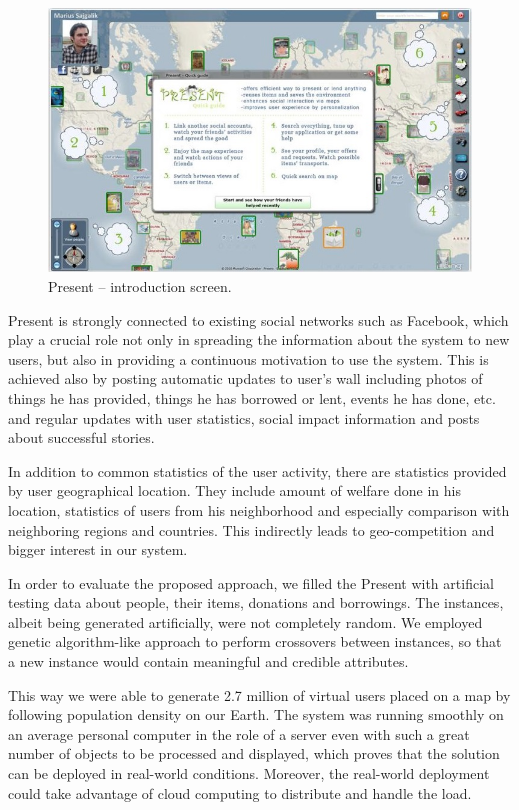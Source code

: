\documentclass[6pt]{article}
\begin{document}
\begin{figure}[ht]
\includegraphics[width=\textwidth]{images/fig4.jpg}
\caption{Present – introduction screen.}
\end{figure}

Present is strongly connected to existing social networks such as Facebook, which play a crucial role not only in spreading the information about the system to new users, but also in providing a continuous motivation to use the system. This is achieved also by posting automatic updates to user's wall including photos of things he has provided, things he has borrowed or lent, events he has done, etc. and regular updates with user statistics, social impact information and posts about successful stories.

In addition to common statistics of the user activity, there are statistics provided by user geographical location. They include amount of welfare done in his location, statistics of users from his neighborhood and especially comparison with neighboring regions and countries. This indirectly leads to geo-competition and bigger interest in our system.

In order to evaluate the proposed approach, we filled the Present with artificial testing data about people, their items, donations and borrowings. The instances, albeit being generated artificially, were not completely random. We employed genetic algorithm-like approach to perform crossovers between instances, so that a new instance would contain meaningful and credible attributes.

This way we were able to generate 2.7 million of virtual users placed on a map by following population density on our Earth. The system was running smoothly on an average personal computer in the role of a server even with such a great number of objects to be processed and displayed, which proves that the solution can be deployed in real-world conditions. Moreover, the real-world deployment could take advantage of cloud computing to distribute and handle the load.
\end{document}
